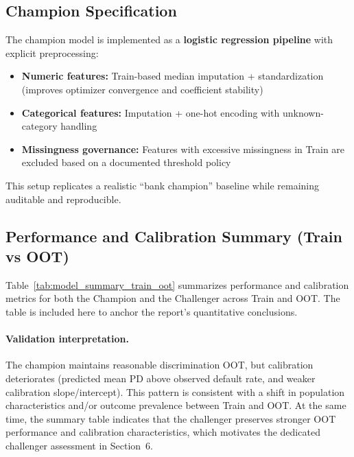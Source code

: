 \documentclass[11pt,a4paper]{article}
\begin{document}
\subsection{Champion Specification}
The champion model is implemented as a \textbf{logistic regression pipeline} with explicit preprocessing:
\begin{itemize}[leftmargin=*, itemsep=0.25em]
\item \textbf{Numeric features:} Train-based median imputation + standardization (improves optimizer convergence and coefficient stability)
\item \textbf{Categorical features:} Imputation + one-hot encoding with unknown-category handling
\item \textbf{Missingness governance:} Features with excessive missingness in Train are excluded based on a documented threshold policy
\end{itemize}

This setup replicates a realistic ``bank champion'' baseline while remaining auditable and reproducible.

\subsection{Performance and Calibration Summary (Train vs OOT)}
Table~\ref{tab:model_summary_train_oot} summarizes performance and calibration metrics for both the Champion and the Challenger across Train and OOT. The table is included here to anchor the report's quantitative conclusions.

\begin{table}[H]
\centering
\caption{Performance and calibration summary (Train vs OOT).}
\label{tab:model_summary_train_oot}

\end{table}

\paragraph{Validation interpretation.}
The champion maintains reasonable discrimination OOT, but calibration deteriorates (predicted mean PD above observed default rate, and weaker calibration slope/intercept). This pattern is consistent with a shift in population characteristics and/or outcome prevalence between Train and OOT. At the same time, the summary table indicates that the challenger preserves stronger OOT performance and calibration characteristics, which motivates the dedicated challenger assessment in Section~6.
\end{document}
